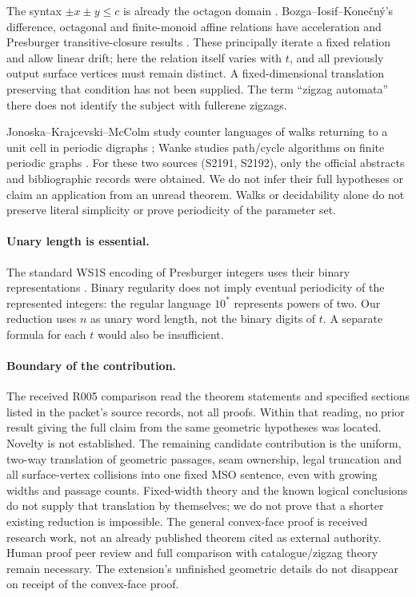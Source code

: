 \documentclass[11pt]{amsart}
\theoremstyle{definition}\newtheorem{definition}{Definition}
\begin{document}
The syntax $\pm x\pm y\le c$ is already the octagon domain
\cite[p.~1]{Mine}. Bozga--Iosif--Kone\v{c}n\'y's difference,
octagonal and finite-monoid affine relations have acceleration and
Presburger transitive-closure results
\cite[Definition 1 and Sections 4.2.1--4.2.2]{Bozga}. These principally
iterate a fixed relation and allow linear drift; here the relation
itself varies with $t$, and all previously output surface vertices
must remain distinct. A fixed-dimensional translation preserving that
condition has not been supplied. The term ``zigzag automata'' there
does not identify the subject with fullerene zigzags.

Jonoska--Krajcevski--McColm study counter languages of walks returning
to a unit cell in periodic digraphs \cite{Counter}; Wanke studies
path/cycle algorithms on finite periodic graphs \cite{Wanke}.
For these two sources (S2191, S2192), only the official abstracts and
bibliographic records were obtained. We do not infer their full
hypotheses or claim an application from an unread theorem. Walks or
decidability alone do not preserve literal simplicity or prove
periodicity of the parameter set.

\paragraph{Unary length is essential.}
The standard WS1S encoding of Presburger integers uses their binary
representations \cite[printed pp.~11--12]{Thomas}. Binary regularity
does not imply eventual periodicity of the represented integers:
the regular language $10^*$ represents powers of two. Our reduction
uses $n$ as unary word length, not the binary digits of $t$.
A separate formula for each $t$ would also be insufficient.

\paragraph{Boundary of the contribution.}
The received R005 comparison read the theorem statements and specified
sections listed in the packet's source records, not all proofs. Within
that reading, no prior result giving the full claim from the same
geometric hypotheses was located. Novelty is not established. The
remaining candidate contribution is the uniform, two-way translation
of geometric passages, seam ownership, legal truncation and all
surface-vertex collisions into one fixed MSO sentence, even with
growing widths and passage counts. Fixed-width theory and the known
logical conclusions do not supply that translation by themselves;
we do not prove that a shorter existing reduction is impossible.
The general convex-face proof is received research work, not an
already published theorem cited as external authority. Human proof
peer review and full comparison with catalogue/zigzag theory remain
necessary. The extension's unfinished geometric details do not
disappear on receipt of the convex-face proof.
\end{document}
